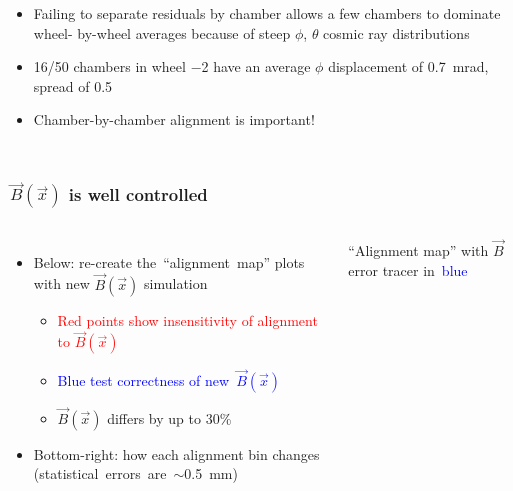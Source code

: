 \documentclass[compress]{beamer}
\begin{document}
\begin{frame}
\begin{columns}
\begin{itemize}
\item Failing to separate residuals by chamber allows a few chambers
  to dominate wheel- by-wheel averages because of steep $\phi$,
  $\theta$ cosmic ray distributions

\item 16/50 chambers in wheel $-$2 have an average $\phi$ displacement of
  0.7~mrad, spread of 0.5

\item Chamber-by-chamber alignment is important!
\end{itemize}
\end{columns}
\end{frame}

\begin{frame}
\frametitle{$\vec{B}(\vec{x})$ is well controlled}

\vspace{-0.5 cm}
\begin{columns}

\vspace{0.7 cm}
\begin{itemize}
\item Below: re-create \mbox{the ``alignment map''\hspace{-0.5 cm}} plots with new $\vec{B}(\vec{x})$ simulation
\begin{itemize}
\item \textcolor{red}{\scriptsize Red points show insensitivity of alignment to $\vec{B}(\vec{x})$}
\item \textcolor{blue}{\scriptsize Blue test correctness of \mbox{new $\vec{B}(\vec{x})$\hspace{-1 cm}}}
\item \scriptsize $\vec{B}(\vec{x})$ differs by up to 30\%
\end{itemize}
\item Bottom-right: how each alignment bin changes \mbox{(statistical errors are $\sim$0.5~mm)\hspace{-1 cm}}
\end{itemize}

``Alignment map'' with $\vec{B}$ error tracer \mbox{in \textcolor{blue}{blue}\hspace{-1 cm}}


\end{columns}
\end{frame}
\end{document}
